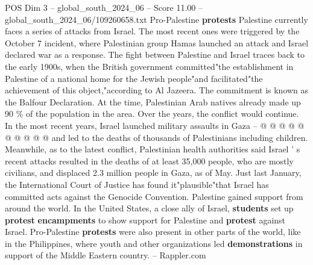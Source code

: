 \begin{textsample}{POS Dim 3 – global\_south\_2024\_06 – Score 11.00 – global\_south\_2024\_06/109260658.txt}
Pro-Palestine \textbf{protests} Palestine currently faces a series of attacks from Israel.
The most recent ones were triggered by the October 7 incident, where Palestinian group Hamas launched an attack and Israel declared war as a response.
The fight between Palestine and Israel traces back to the early 1900s, when the British government committed"the establishment in Palestine of a national home for the Jewish people"and facilitated"the achievement of this object,"according to Al Jazeera.
The commitment is known as the Balfour Declaration.
At the time, Palestinian Arab natives already made up 90 \% of the population in the area.
Over the years, the conflict would continue.
In the most recent years, Israel launched military assaults in Gaza -- @ @ @ @ @ @ @ @ @ @ and led to the deaths of thousands of Palestinians including children.
Meanwhile, as to the latest conflict, Palestinian health authorities said Israel ' s recent attacks resulted in the deaths of at least 35,000 people, who are mostly civilians, and displaced 2.3 million people in Gaza, as of May.
Just last January, the International Court of Justice has found it"plausible"that Israel has committed acts against the Genocide Convention.
Palestine gained support from around the world.
In the United States, a close ally of Israel, \textbf{students} set up \textbf{protest} \textbf{encampments} to show support for Palestine and \textbf{protest} against Israel.
Pro-Palestine \textbf{protests} were also present in other parts of the world, like in the Philippines, where youth and other organizations led \textbf{demonstrations} in support of the Middle Eastern country. -- Rappler.com

\end{textsample}
